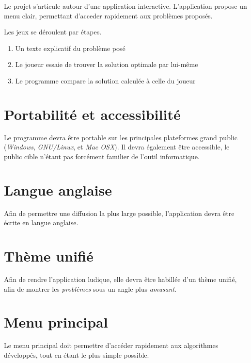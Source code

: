 Le projet s'articule autour d'une application interactive.
L'application propose un menu clair, permettant
d'acceder rapidement aux problèmes proposés.

Les jeux se déroulent par étapes.
\begin{enumerate}
    \item Un texte explicatif du problème posé
    \item Le joueur essaie de trouver la solution optimale par lui-même
    \item Le programme compare la solution calculée à celle du joueur
\end{enumerate}

\section{Portabilité et accessibilité}
    Le programme devra être portable sur les principales plateformes
    grand public (\emph{Windows}, \emph{GNU/Linux}, et \emph{Mac OSX}).
    Il devra également être accessible, le public cible n'étant
    pas forcément familier de l'outil informatique.

\section{Langue anglaise}
    Afin de permettre une diffusion la plus large possible,
    l'application devra être écrite en langue anglaise.

\section{Thème unifié}
    Afin de rendre l'application ludique, elle devra
    être habillée d'un thème unifié,
    afin de montrer les \emph{problèmes} sous un
    angle plus \emph{amusant}.

\section{Menu principal}
    Le menu principal doit permettre d'accéder rapidement
    aux algorithmes développés, tout en étant le plus simple possible.


